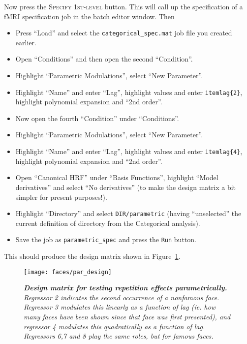 Now press the \textsc{Specify 1st-level} button. This will call up the specification of a fMRI specification job in the batch editor window. Then
\begin{itemize}
\item Press ``Load'' and select the \texttt{categorical\_spec.mat} job file you created earlier.
\item Open ``Conditions'' and then open the second ``Condition''.
\item Highlight ``Parametric Modulations'', select ``New Parameter''.
\item Highlight ``Name'' and enter ``Lag'', highlight values and enter \texttt{itemlag\{2\}}, highlight polynomial expansion and ``2nd order''.
\item Now open the fourth ``Condition'' under ``Conditions''.
\item Highlight ``Parametric Modulations'', select ``New Parameter''.
\item Highlight ``Name'' and enter ``Lag'', highlight values and enter \texttt{itemlag\{4\}}, highlight polynomial expansion and ``2nd order''.
\item Open ``Canonical HRF'' under ``Basis Functions'', highlight ``Model derivatives'' and select ``No derivatives'' (to make the design matrix a bit simpler for present purposes!).
\item Highlight ``Directory'' and select \texttt{DIR/parametric} (having ``unselected'' the current definition of directory from the Categorical analysis).
\item Save the job as \texttt{parametric\_spec} and press the \texttt{Run} button.
\end{itemize}

This should produce the design matrix shown in Figure~\ref{par_design}.

\begin{figure}
\begin{center}
\texttt{[image: faces/par\_design]}
\caption{\em \textbf{Design matrix for testing repetition effects parametrically.} Regressor 2 indicates the second occurrence of a nonfamous face. Regressor 3 modulates this linearly as a function of lag (ie. how many faces have been shown since that face was first presented), and regressor 4 modulates this quadratically as a function of lag. Regressors 6,7 and 8 play the same roles, but for famous faces. \label{par_design} }
\end{center}
\end{figure}

